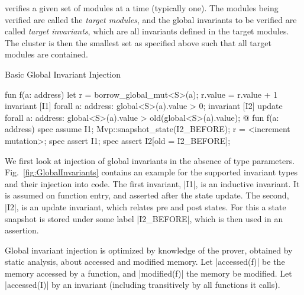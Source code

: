 
\MVP verifies a given set of modules at a time (typically one).  The modules
being verified are called the \textit{target modules}, and the global invariants
to be verified are called \textit{target invariants}, which are all invariants
defined in the target modules. The cluster is then the smallest set as specified
above such that all target modules are contained.


\begin{Figure}
  \caption{Basic Global Invariant Injection}
  \label{fig:GlobalInvariants}
  \centering
\begin{MoveBox}
  fun f(a: address) {
    let r = borrow_global_mut<S>(a);
    r.value = r.value + 1
  }
  invariant [I1] forall a: address: global<S>(a).value > 0;
  invariant [I2] update forall a: address:
      global<S>(a).value > old(global<S>(a).value);
  @\transform@
  fun f(a: address) {
    spec assume I1;
    Mvp::snapshot_state(I2_BEFORE);
    r = <increment mutation>;
    spec assert I1;
    spec assert I2[old = I2_BEFORE];
  }
\end{MoveBox}
\end{Figure}


We first look at injection of global invariants in the absence of
type parameters. Fig.~\ref{fig:GlobalInvariants} contains an
example for the supported invariant types and their injection into code. The
first invariant, |I1|, is an inductive invariant. It is assumed on function
entry, and asserted after the state update. The second, |I2|, is an update
invariant, which relates pre and post states. For this a state snapshot is
stored under some label |I2_BEFORE|, which is then used in an assertion.

Global invariant injection is optimized by knowledge of the prover, obtained by
static analysis, about accessed and modified memory.  Let |accessed(f)| be the
memory accessed by a function, and |modified(f)| the memory be modified. Let
|accessed(I)| by an invariant (including transitively by all functions it
calls).

